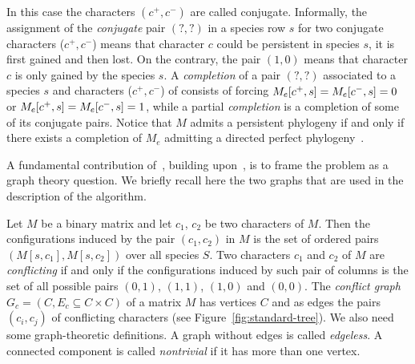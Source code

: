 

In this case the characters $(c^{+}, c^{-})$ are called conjugate.
Informally, the assignment of the \emph{conjugate} pair $(?,?)$ in a species
row $s$ for two conjugate characters ($c^{+}, c^{-}$) means that
character $c$ could be persistent in species $s$, \ie it is first gained and
then lost.
On the contrary, the pair $(1,0)$ means that character $c$ is only gained by
the species $s$.
A \emph{completion}  of  a pair $(?,?)$  associated to a species $s$ and
characters ($c^{+}, c^{-}$) of  \me  consists
of forcing $M_{e} [c^{+},s]=M_{e} [c^{-},s]=0$ or  $M_{e} [c^{+},s]=M_{e} [c^{-},s]=1$,
while a partial \emph{completion}  \me is a completion of some of its conjugate
pairs.
Notice that $M$ admits a persistent phylogeny  if
and only if there exists a completion  of $M_e$ admitting a directed perfect
phylogeny~\cite{DBLP:journals-tcs-BonizzoniBDT12}.





A fundamental contribution of~\cite{DBLP:journals-tcs-BonizzoniBDT12}, building
upon~\cite{Sha}, is to frame the problem as a graph theory question.
We briefly recall here the two graphs that are used in the description of the algorithm.


Let $M$ be a binary matrix and let $c_{1}$, $c_{2}$ be two characters of $M$.
Then the configurations induced by the pair $( c_{1}, c_{2} )$ in $M$ is the
set of ordered pairs $( M[s,c_{1}], M[s,c_{2}])$ over all species $S$.
Two characters $c_{1}$ and $c_{2}$ of $M$ are \emph{conflicting} if and only if
the configurations induced by such pair
of columns is the set of all possible pairs $( 0,1)$, $( 1,1) $, $(1,0) $ and
$( 0,0) $.
The \emph{conflict graph}  $G_c =( C,E_{c}\subseteq C \times C)$ of a matrix $M$
has vertices $C$ and as edges the pairs $(c_{i}, c_{j})$ of conflicting characters (see Figure~\ref{fig:standard-tree}).
%
We also need some graph-theoretic definitions.
A graph without edges is called \emph{edgeless}.
A connected component is called \emph{nontrivial} if it has more than one
vertex.



